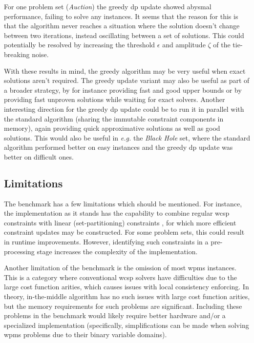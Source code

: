 For one problem set (\emph{Auction}) the greedy \gls{dp} update showed abysmal performance, failing to solve any instances.
It seems that the reason for this is that the algorithm never reaches a situation where the solution doesn't change between two iterations, instead oscillating between a set of solutions.
This could potentially be resolved by increasing the threshold \(\epsilon\) and amplitude \(\zeta\) of the tie-breaking noise.

With these results in mind, the greedy algorithm may be very useful when exact solutions aren't required.
The greedy update variant may also be useful as part of a broader strategy, by for instance providing fast and good upper bounds or by providing fast unproven solutions while waiting for exact solvers.
Another interesting direction for the greedy \gls{dp} update could be to run it in parallel with the standard algorithm (sharing the immutable constraint components in memory), again providing quick approximative solutions as well as good solutions.
This would also be useful in \emph{e.g.} the \emph{Black Hole} set, where the standard algorithm performed better on easy instances and the greedy \gls{dp} update was better on difficult ones.

\subsection{Limitations}
The benchmark has a few limitations which should be mentioned.
For instance, the implementation as it stands has the capability to combine regular \gls{wcsp} constraints with linear (set-partitioning) constraints \parencite[\pno~102]{Wedelin08}, for which more efficient constraint updates may be constructed.
For some problem sets, this could result in runtime improvements.
However, identifying such constraints in a pre-processing stage increases the complexity of the implementation.

Another limitation of the benchmark is the omission of most \gls{wpms} instances.
This is a category where conventional \gls{wcsp} solvers have difficulties due to the large cost function arities, which causes issues with local consistency enforcing.
In theory, in-the-middle algorithm has no such issues with large cost function arities, but the memory requirements for such problems are significant.
Including these problems in the benchmark would likely require better hardware and/or a specialized implementation (specifically, simplifications can be made when solving \gls{wpms} problems due to their binary variable domains).
